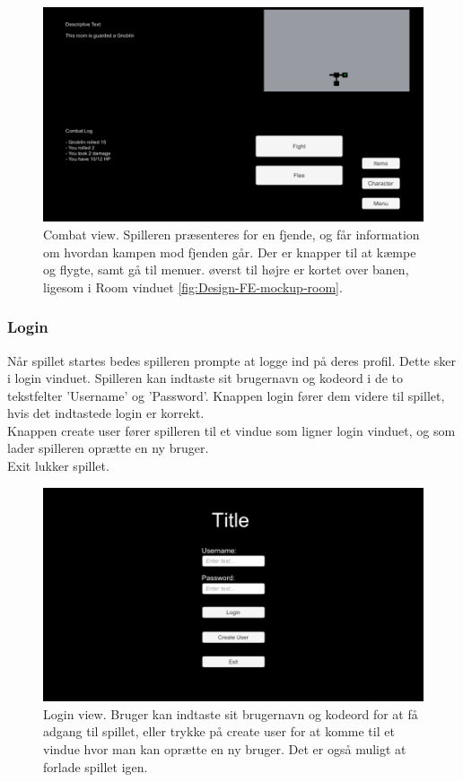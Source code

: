 \begin{figure}[H]
\centering
\includegraphics[width = \textwidth]{02-Body/Images/CombatMockup.PNG}
\caption{Combat view. Spilleren præsenteres for en fjende, og får information om hvordan kampen mod fjenden går. Der er knapper til at kæmpe og flygte, samt gå til menuer. øverst til højre er kortet over banen, ligesom i Room vinduet \autoref{fig:Design-FE-mockup-room}.}
\label{fig:Design-FE-mockup-combat}
\end{figure}


\subsubsection{Login}

Når spillet startes bedes spilleren prompte at logge ind på deres profil. Dette sker i login vinduet. Spilleren kan indtaste sit brugernavn og kodeord i de to tekstfelter 'Username' og 'Password'. Knappen login fører dem videre til spillet, hvis det indtastede login er korrekt.\\
Knappen create user fører spilleren til et vindue som ligner login vinduet, og som lader spilleren oprætte en ny bruger.\\
Exit lukker spillet.

\begin{figure}[H]
\centering
\includegraphics[width = \textwidth]{02-Body/Images/LoginMockup.PNG}
\caption{Login view. Bruger kan indtaste sit brugernavn og kodeord for at få adgang til spillet, eller trykke på create user for at komme til et vindue hvor man kan oprætte en ny bruger. Det er også muligt at forlade spillet igen.}
\label{fig:Design-FE-mockup-login}
\end{figure}

